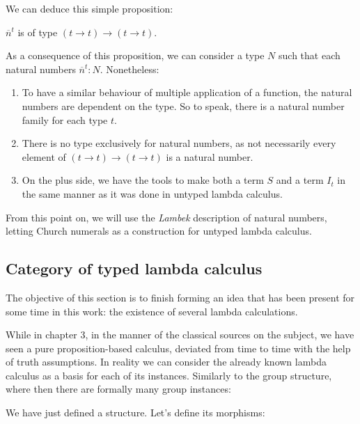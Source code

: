 \begin{definition}
\begin{definition}
\end{definition}
We can deduce this simple proposition:
\begin{proposition}
  $\overline n^t$ is of type $(t\to t)\to(t\to t)$.
\end{proposition}

As a consequence of this proposition, we can consider a type $N$ such that each natural numbers $\overline n^t:N$. Nonetheless:
\begin{enumerate}

\item To have a similar behaviour of multiple application of a function, the natural numbers are dependent on the type. So to speak, there is a natural number family for each type $t$.
\item There is no type exclusively for natural numbers, as not necessarily every element of $(t\to t)\to(t\to t)$ is a natural number.
\item On the plus side, we have the tools to make both a term $S$ and a term $I_t$ in the same manner as it was done in untyped lambda calculus. \\
\end{enumerate}
From this point on, we will use the \emph{Lambek} description of natural numbers, letting Church numerals as a construction for untyped lambda calculus.

\subsection{Category of typed lambda calculus}

The objective of this section is to finish forming an idea that has been present for some time in this work: the existence of several lambda calculations. 

While in chapter 3, in the manner of the classical sources on the subject, we have seen a pure proposition-based calculus, deviated from time to time with the help of truth assumptions. In reality we can consider the already known lambda calculus as a basis for each of its instances. Similarly to the group structure, where then there are formally many group instances:

\begin{definition}

\end{definition}

We have just defined a structure. Let's define its morphisms:


\end{definition}
